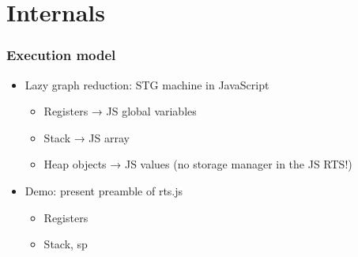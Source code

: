 \documentclass[aspectratio=169]{beamer}
\begin{document}
%


\section{Internals}



\begin{frame}
\frametitle{Execution model}
  \begin{itemize}
    \item Lazy graph reduction: STG machine in JavaScript
      \begin{itemize}
    \item Registers → JS global variables
    \item Stack → JS array
    \item Heap objects  → JS values (no storage manager in the JS RTS!)
      \end{itemize}
    \item Demo: present preamble of rts.js
      \begin{itemize}
        \item Registers
        \item Stack, sp
      \end{itemize}
    \end{itemize}
\end{frame}
\end{document}
